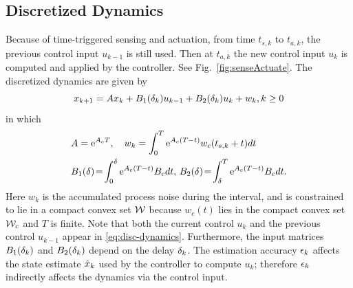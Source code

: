 \subsection{Discretized Dynamics}
Because of time-triggered sensing and actuation, from time $t_{s,k}$ to $t_{a,k}$, the  previous control input $u_{k-1}$
is still used.
Then at $t_{a,k}$ the new control input $u_{k}$
is computed and applied by the controller.
See Fig.~\ref{fig:senseActuate}.
The discretized dynamics are given by
\begin{equation}
\label{eq:disc-dynamics}
x_{k+1}=Ax_{k}+B_{1}(\delta_k)u_{k-1}+B_{2}(\delta_k)u_{k}+w_{k}, k\geq0
\end{equation}
in which
\begin{eqnarray*}
&A=\eu^{A_{c}T}, \quad
w_{k}%
=\int_{0}^{T}\eu^{A_{c}(T-t)}w_{c}(t_{s,k}+t) dt
\\
&B_{1}(\sDelay)%
\!=\!\int_{0}^{\sDelay}\eu^{A_{c}(T-t)}B_{c} dt,\,
B_{2}(\sDelay)%
\!=\!\int_{\sDelay}^{T}\eu^{A_{c}(T-t)}B_{c} dt \text.
\end{eqnarray*}
Here $w_{k}$ is the accumulated process noise during the interval, and is constrained to lie in a compact convex set $\mathcal{W}$ because $w_c(t)$ lies in the compact convex set $\mathcal{W}_c$ and $T$ is finite.
Note that both the current control $u_{k}$ and the previous
control $u_{k-1}$ appear in \eqref{eq:disc-dynamics}.
Furthermore, the input matrices $B_{1}(\delta_k)$ and $B_{2}(\delta_k)$
depend on the delay $\delta_k$.
The estimation accuracy $\epsilon_k$ affects the state estimate
$\hat{x}_{k}$ %
used by the controller to compute $u_{k}$;
therefore $\epsilon_k$ indirectly affects the dynamics via the control
input.








